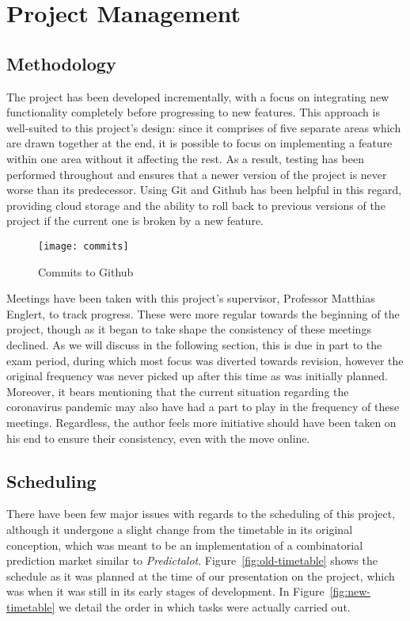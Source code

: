 \section{Project Management}

\label{sec:projectManagement}

\subsection{Methodology}

The project has been developed incrementally, with a focus on integrating new
functionality completely before progressing to new features. This approach is
well-suited to this project's design: since it comprises of five separate areas
which are drawn together at the end, it is possible to focus on implementing a
feature within one area without it affecting the rest. As a result, testing has
been performed throughout and ensures that a newer version of the project is
never worse than its predecessor. Using Git and Github has been helpful in this
regard, providing cloud storage and the ability to roll back to previous
versions of the project if the current one is broken by a new feature.

\begin{figure}[h]
	\centering
	\texttt{[image: commits]}
	\caption{Commits to Github}
	\label{fig:commits}
\end{figure}

Meetings have been taken with this project's supervisor, Professor Matthias
Englert, to track progress. These were more regular towards the beginning of
the project, though as it began to take shape the consistency of these meetings
declined. As we will discuss in the following section, this is due in part to
the exam period, during which most focus was diverted towards revision, however
the original frequency was never picked up after this time as was initially
planned. Moreover, it bears mentioning that the current situation regarding the
coronavirus pandemic may also have had a part to play in the frequency of these
meetings. Regardless, the author feels more initiative should have been taken
on his end to ensure their consistency, even with the move online.

\subsection{Scheduling}

There have been few major issues with regards to the scheduling of this
project, although it undergone a slight change from the timetable in its
original conception, which was meant to be an implementation of a combinatorial
prediction market similar to \emph{Predictalot}. Figure~\ref{fig:old-timetable}
shows the schedule as it was planned at the time of our presentation on the
project, which was when it was still in its early stages of development. In
Figure~\ref{fig:new-timetable} we detail the order in which tasks were actually
carried out.

